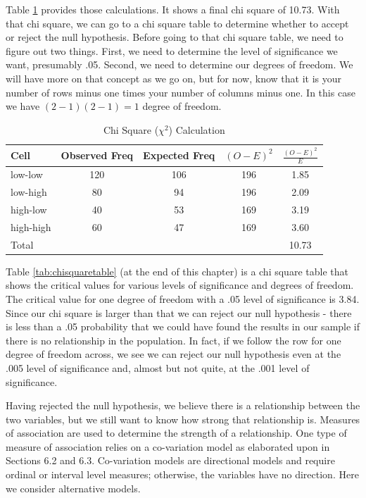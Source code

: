 \documentclass[11pt,openany]{book}\usepackage[]{graphicx}\usepackage[]{color}
\begin{document}
Table \ref{tab:IV_DV_Table4} provides those calculations.   It shows a final chi square of 10.73.  With that chi square, we can go to a chi square table to determine whether to accept or reject the null hypothesis.  Before going to that chi square table, we need to figure out two things.  First, we need to determine the level of significance we want, presumably .05.  Second, we need to determine our degrees of freedom.  We will have more on that concept as we go on, but for now, know that it is your number of rows minus one times your number of columns minus one.  In this case we have $(2-1)(2-1) = 1$ degree of freedom.  
	 
\begin{table}[h]
\centering
\caption{Chi Square ($\chi^2$) Calculation } \label{tab:IV_DV_Table4}
\begin{tabular}{|l|c|c|c|c|}
\hline
Cell & Observed Freq & Expected Freq & $(O-E)^2$ & $\frac{(O-E)^2}{E}$ \\ \hline
low-low & 120 & 106 & 196 & 1.85 \\ \hline
low-high & 80 & 94 & 196 & 2.09 \\ \hline
high-low & 40 & 53 & 169 & 3.19 \\ \hline
high-high & 60 & 47 & 169 & 3.60 \\ \hline
Total &  &  &  & 10.73 \\ \hline
\end{tabular}
\end{table}

Table \ref{tab:chisquaretable} (at the end of this chapter) is a chi square table that shows the critical values for various levels of significance and degrees of freedom.   The critical value for one degree of freedom with a .05 level of significance is 3.84.  Since our chi square is larger than that we can reject our null hypothesis - there is less than a .05 probability that we could have found the results in our sample if there is no relationship in the population.  In fact, if we follow the row for one degree of freedom across, we see we can reject our null hypothesis even at the .005 level of significance and, almost but not quite, at the .001 level of significance.  

Having rejected the null hypothesis, we believe there is a relationship between the two variables, but we still want to know how strong that relationship is.   Measures of association are used to determine the strength of a relationship. One type of measure of association relies on a co-variation model as elaborated upon in Sections 6.2 and 6.3.  Co-variation models are directional models and require ordinal or interval level measures; otherwise, the variables have no direction.  Here we consider alternative models. 
\end{document}

